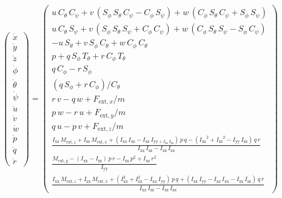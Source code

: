\documentclass[lettersize,journal]{IEEEtran}
\begin{document}
{\begin{equation}
\left(\begin{array}{c} \dot{x}\\ \dot{y}\\ \dot{z}\\ \dot{\phi }\\ \dot{\theta }\\ \dot{\psi }\\ \dot{u}\\ \dot{v}\\ \dot{w}\\ \dot{p}\\ \dot{q}\\ \dot{r} \end{array}\right)=\left(\begin{array}{c} u\,C_{\theta }\,C_{\psi } + v\,\left(S_{\phi }\,S_{\theta }\,C_{\psi }-C_{\phi }\,S_{\psi }\right) + w\,\left(C_{\phi }\,S_{\theta }\,C_{\psi } + S_{\phi }\,S_{\psi }\right)\\ u\,C_{\theta }\,S_{\psi } + v\,\left(S_{\phi }\,S_{\theta }\,S_{\psi }+C_{\phi }\,C_{\psi }\right)+w\,\left(C_{\phi }\,S_{\theta }\,S_{\psi }-S_{\phi }\,C_{\psi }\right)\\ -u\,S_{\theta }+v\,S_{\phi }\,C_{\theta }+w\,C_{\phi }\,C_{\theta } \\ p+q\,S_{\phi }\,T_{\theta }+r\,C_{\phi }\,T_{\theta }\\ q\,C_{\phi }-r\,S_{\phi }\\ \left(q\,S_{\phi }+r\,C_{\phi }\right)/C_{\theta } \\ r\,v-q\,w+F_{\mathrm{ext},x}/m\\ p\,w-r\,u+F_{\mathrm{ext},y}/m\\ q\,u-p\,v+F_{\mathrm{ext},z}/m \\ \frac{I_{\mathrm{xz}}\,M_{\mathrm{ext},z}+I_{\mathrm{zz}}\,M_{\mathrm{ext},x} + \left(I_{\mathrm{xx}}\,I_{\mathrm{xz}}-I_{\mathrm{xz}}\,I_{\mathrm{yy}+I_{\mathrm{zx}}\,I_{\mathrm{zz}}} \right)\,p\,q - \left({I_{\mathrm{xz}}}^2 + {I_{\mathrm{zz}}}^2 - I_{\mathrm{yy}}\,I_{\mathrm{zz}} \right)\,q\,r}{I_{\mathrm{xx}}\,I_{\mathrm{zz}}-I_{\mathrm{xz}}\,I_{\mathrm{zx}}} \\ \frac{M_{\mathrm{ext},y}- \left(I_{\mathrm{xx}}-I_{\mathrm{zz}}\right)\,p\,r-I_{\mathrm{zx}}\,p^2+I_{\mathrm{xz}}\,r^2}{I_{\mathrm{yy}}} \\ \frac{I_{\mathrm{xx}}\,M_{\mathrm{ext},z}+I_{\mathrm{zx}}\,M_{\mathrm{ext},x}+\left(I_{\mathrm{xx}}^2+I_{\mathrm{zx}}^2-I_{\mathrm{xx}}\,I_{\mathrm{yy}}\right)\,p\,q+\left(I_{\mathrm{zx}}\,I_{\mathrm{yy}}-I_{\mathrm{xz}}\,I_{\mathrm{xx}}-I_{\mathrm{zx}}\,I_{\mathrm{zz}}\right)\,q\,r}{I_{\mathrm{xx}}\,I_{\mathrm{zz}}-I_{\mathrm{xz}}\,I_{\mathrm{zx}}} \end{array}\right)
\end{equation}

}
\end{document}
